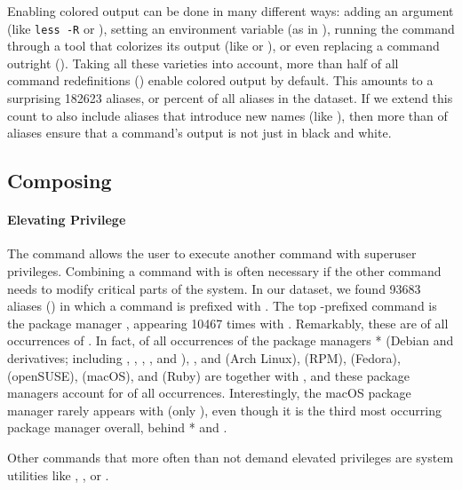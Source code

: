 Enabling colored output can be done in many different ways: adding an argument (like \texttt{less -R} or ), setting an environment variable (as in ), running the command through a tool that colorizes its output (like  or ), or even replacing a command outright ().
Taking all these varieties into account, more than half of all command redefinitions () enable colored output by default.
This amounts to a surprising \num{182623} aliases, or  percent of all aliases in the dataset.
If we extend this count to also include aliases that introduce new names (like ), then more than  of aliases ensure that a command's output is not just in black and white.

\subsection{Composing}

\TODO

\paragraph{\bf Elevating Privilege}

The  command allows the user to execute another command with superuser privileges.
Combining a command with  is often necessary if the other command needs to modify critical parts of the system.
In our dataset, we found \num{93683} aliases () in which a command is prefixed with .
The top -prefixed command is the package manager , appearing \num{10467} times with .
Remarkably, these are  of all occurrences of .
In fact,  of all occurrences of the package managers * (Debian and derivatives; including , , , , and ), ,  and  (Arch Linux),  (RPM),  (Fedora),  (openSUSE),  (macOS), and  (Ruby) are together with , and these package managers account for  of all  occurrences.
Interestingly, the macOS package manager  rarely appears with  (only ), even though it is the third most occurring package manager overall, behind * and .

Other commands that more often than not demand elevated privileges are system utilities like , ,  or .

